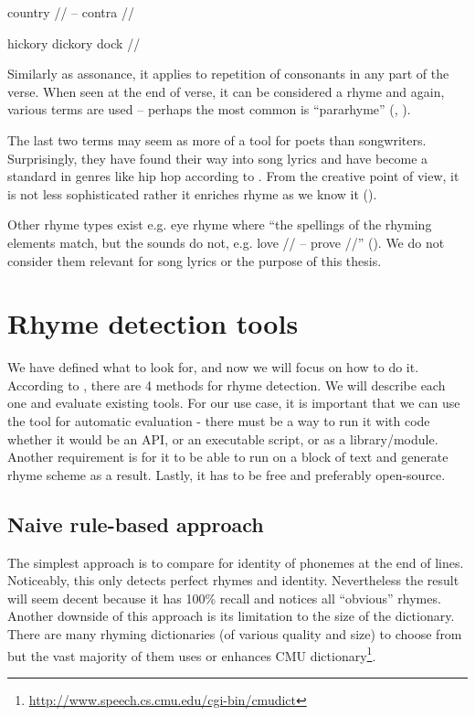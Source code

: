 country // -- contra //

hickory dickory dock //

\noindent Similarly as assonance, it applies to repetition of consonants in any part of the verse. When seen at the end of verse, it can be considered a rhyme and again, various terms are used -- perhaps the most common is ``pararhyme'' (\cite{britannica}, \cite{oxforddict2008literary}).
\newline

The last two terms may seem as more of a tool for poets than songwriters. Surprisingly, they have found their way into song lyrics and have become a standard in genres like hip hop according to \cite{vanphonological}. From the creative point of view, it is not less sophisticated rather it enriches rhyme as we know it (\cite{brogan2016poeticterms}).


Other rhyme types exist e.g. eye rhyme where ``the spellings of the rhyming elements match, but the sounds do not, e.g. love // -- prove //'' (\cite{oxforddict2008literary}). We do not consider them relevant for song lyrics or the purpose of this thesis.


\section{Rhyme detection tools}\label{rhyme_detection_tools}
We have defined what to look for, and now we will focus on how to do it. According to \cite{plechac2017presentation}, there are 4 methods for rhyme detection. We will describe each one and evaluate existing tools. For our use case, it is important that we can use the tool for automatic evaluation - there must be a way to run it with code whether it would be an API, or an executable script, or as a library/module. Another requirement is for it to be able to run on a block of text and generate rhyme scheme as a result. Lastly, it has to be free and preferably open-source.

\subsection{Naive rule-based approach} 
The simplest approach is to compare for identity of phonemes at the end of lines. Noticeably,  this only detects perfect rhymes and identity. Nevertheless the result will seem decent because it has 100\% recall and notices all ``obvious'' rhymes. Another downside of this approach is its limitation to the size of the dictionary. There are many rhyming dictionaries (of various quality and size) to choose from but the vast majority of them uses or enhances CMU dictionary\footnote{\url{http://www.speech.cs.cmu.edu/cgi-bin/cmudict}}. 
